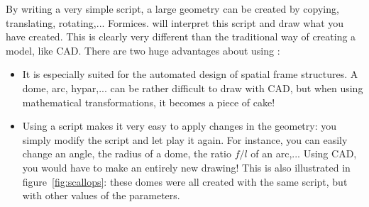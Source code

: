 By writing a very simple script, a large geometry can be created by copying, translating, rotating,... Formices. \pyformex will interpret this script and draw what you have created. This is clearly very different than the traditional way of creating a model, like CAD. There are two huge advantages about using \pyformex:
\begin{itemize}
\item It is especially suited for the automated design of spatial frame structures. A dome, arc, hypar,... can be rather difficult to draw with CAD, but when using mathematical transformations, it becomes a piece of cake!
\item Using a script makes it very easy to apply changes in the geometry: you simply modify the script and let \pyformex play it again. For instance, you can easily change an angle, the radius of a dome, the ratio $f/l$ of an arc,... Using CAD, you would have to make an entirely new drawing! This is also illustrated in figure~\ref{fig:scallops}: these domes were all created with the same script, but with other values of the parameters.
\end{itemize}
